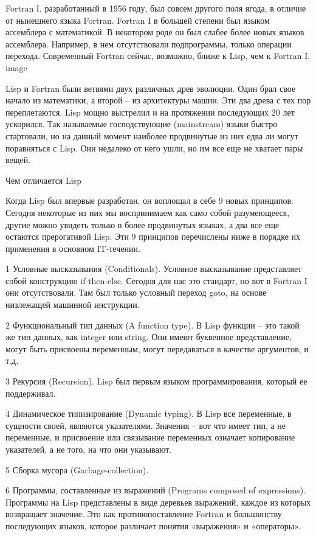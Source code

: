 \documentclass[ebook,12pt,oneside,openany]{memoir}
\begin{document}
Fortran I, разработанный в 1956 году, был совсем другого поля ягода, в
отличие от нынешнего языка Fortran. Fortran I в большей степени был
языком ассемблера с математикой. В некотором роде он был слабее более
новых языков ассемблера. Например, в нем отсутствовали подпрограммы,
только операции перехода. Современный Fortran сейчас, возможно, ближе
к Lisp, чем к Fortran I. image

Lisp и Fortran были ветвями двух различных древ эволюции. Один брал
свое начало из математики, а второй – из архитектуры машин. Эти два
древа с тех пор переплетаются. Lisp мощно выстрелил и на протяжении
последующих 20 лет ускорился. Так называемые господствующие
(mainstream) языки быстро стартовали, но на данный момент наиболее
продвинутые из них едва ли могут поравняться с Lisp. Они недалеко от
него ушли, но им все еще не хватает пары вещей.


Чем отличается Lisp

Когда Lisp был впервые разработан, он воплощал в себе 9 новых
принципов. Сегодня некоторые из них мы воспринимаем как само собой
разумеющееся, другие можно увидеть только в более продвинутых языках,
а два все еще остаются прерогативой Lisp. Эти 9 принципов перечислены
ниже в порядке их применения в основном IT-течении.




1 Условные высказывания (Conditionals). Условное высказывание
представляет собой конструкцию if-then-else. Сегодня для нас это
стандарт, но вот в Fortran I они отсутствовали. Там был только
условный переход goto, на основе низлежащей машинной инструкции.

2 Функциональный тип данных (A function type). В Lisp функции – это
такой же тип данных, как integer или string. Они имеют буквенное
представление, могут быть присвоены переменным, могут передаваться в
качестве аргументов, и т.д.

3 Рекурсия (Recursion). Lisp был первым языком программирования,
который ее поддерживал.

4 Динамическое типизирование (Dynamic typing). В Lisp все переменные,
в сущности своей, являются указателями. Значения – вот что имеет тип,
а не переменные, и присвоение или связывание переменных означает
копирование указателей, а не того, на что они указывают.

5 Сборка мусора (Garbage-collection).

6 Программы, составленные из выражений (Programs composed of
expressions). Программы на Lisp представлены в виде деревьев
выражений, каждое из которых возвращает значение. Это как
противопоставление Fortran и большинству последующих языков, которое
различает понятия «выражения» и «операторы».
\end{document}
